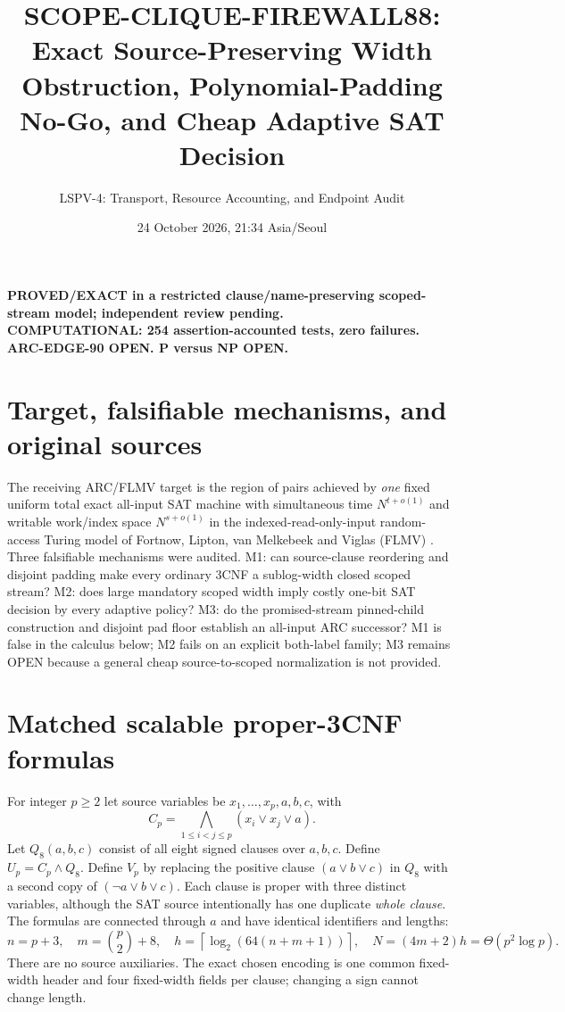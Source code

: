 \documentclass[11pt]{article}
\title{SCOPE-CLIQUE-FIREWALL88: Exact Source-Preserving Width Obstruction, Polynomial-Padding No-Go, and Cheap Adaptive SAT Decision}
\author{LSPV-4: Transport, Resource Accounting, and Endpoint Audit}
\date{24 October 2026, 21:34 Asia/Seoul}
\begin{document}
\maketitle
\begin{center}
\textbf{PROVED/EXACT in a restricted clause/name-preserving scoped-stream model; independent review pending.}\\
\textbf{COMPUTATIONAL: 254 assertion-accounted tests, zero failures.}\\
\textbf{ARC-EDGE-90 OPEN. P versus NP OPEN.}
\end{center}

\section{Target, falsifiable mechanisms, and original sources}
The receiving ARC/FLMV target is the region of pairs achieved by \emph{one} fixed uniform total exact all-input SAT machine with simultaneous time $N^{t+o(1)}$ and writable work/index space $N^{s+o(1)}$ in the indexed-read-only-input random-access Turing model of Fortnow, Lipton, van Melkebeek and Viglas (FLMV) \cite{flmv}. Three falsifiable mechanisms were audited. M1: can source-clause reordering and disjoint padding make every ordinary 3CNF a sublog-width closed scoped stream? M2: does large mandatory scoped width imply costly one-bit SAT decision by every adaptive policy? M3: do the promised-stream pinned-child construction \cite{scope92} and disjoint pad floor \cite{pad87} establish an all-input ARC successor? M1 is false in the calculus below; M2 fails on an explicit both-label family; M3 remains OPEN because a general cheap source-to-scoped normalization is not provided.

\section{Matched scalable proper-3CNF formulas}
For integer $p\ge2$ let source variables be $x_1,\ldots,x_p,a,b,c$, with
\[
 C_p=\bigwedge_{1\le i<j\le p}(x_i\vee x_j\vee a).
\]
Let $Q_8(a,b,c)$ consist of all eight signed clauses over $a,b,c$. Define $U_p=C_p\land Q_8$. Define $V_p$ by replacing the positive clause $(a\vee b\vee c)$ in $Q_8$ with a second copy of $(\neg a\vee b\vee c)$. Each clause is proper with three distinct variables, although the SAT source intentionally has one duplicate \emph{whole clause}. The formulas are connected through $a$ and have identical identifiers and lengths:
\[
 n=p+3,\quad m=\binom p2+8,\quad
 h=\left\lceil\log_2(64(n+m+1))\right\rceil,\quad
 N=(4m+2)h=\Theta(p^2\log p).
\]
There are no source auxiliaries. The exact chosen encoding is one common fixed-width header and four fixed-width fields per clause; changing a sign cannot change length.
\end{document}
